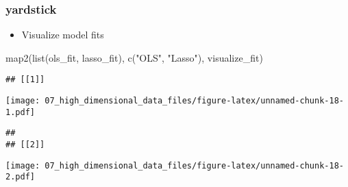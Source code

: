 \documentclass[
]{book}
\newenvironment{Shaded}{\begin{snugshade}}{\end{snugshade}}
\newcommand{\FunctionTok}[1]{\textcolor[rgb]{0.00,0.00,0.00}{#1}}
\newcommand{\NormalTok}[1]{#1}
\newcommand{\StringTok}[1]{\textcolor[rgb]{0.31,0.60,0.02}{#1}}
\providecommand{\tightlist}{%
  \setlength{\itemsep}{0pt}\setlength{\parskip}{0pt}}
\begin{document}
\hypertarget{yardstick}{%
\subsubsection{yardstick}\label{yardstick}}

\begin{itemize}
\tightlist
\item
  Visualize model fits
\end{itemize}

\begin{Shaded}
\begin{Highlighting}[]
\FunctionTok{map2}\NormalTok{(}\FunctionTok{list}\NormalTok{(ols\_fit, lasso\_fit), }\FunctionTok{c}\NormalTok{(}\StringTok{"OLS"}\NormalTok{, }\StringTok{"Lasso"}\NormalTok{), visualize\_fit) }
\end{Highlighting}
\end{Shaded}

\begin{verbatim}
## [[1]]
\end{verbatim}

\texttt{[image: 07\_high\_dimensional\_data\_files/figure-latex/unnamed-chunk-18-1.pdf]}

\begin{verbatim}
## 
## [[2]]
\end{verbatim}

\texttt{[image: 07\_high\_dimensional\_data\_files/figure-latex/unnamed-chunk-18-2.pdf]}
\end{document}
